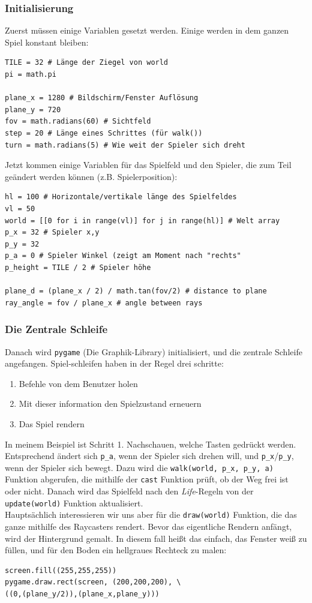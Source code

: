 \documentclass[a4paper,12pt]{report}
\begin{document}
\subsubsection{Initialisierung}

Zuerst müssen einige Variablen gesetzt werden. Einige werden in dem ganzen Spiel konstant bleiben:
\begin{Verbatim}[baselinestretch=1.0, xleftmargin=1cm]
TILE = 32 # Länge der Ziegel von world
pi = math.pi

plane_x = 1280 # Bildschirm/Fenster Auflösung
plane_y = 720
fov = math.radians(60) # Sichtfeld
step = 20 # Länge eines Schrittes (für walk())
turn = math.radians(5) # Wie weit der Spieler sich dreht
\end{Verbatim}

Jetzt kommen einige Variablen für das Spielfeld und den Spieler, die zum Teil geändert werden können (z.B. Spielerposition):
\begin{Verbatim}[baselinestretch=1.0, xleftmargin=1cm]
hl = 100 # Horizontale/vertikale länge des Spielfeldes
vl = 50
world = [[0 for i in range(vl)] for j in range(hl)] # Welt array
p_x = 32 # Spieler x,y
p_y = 32
p_a = 0 # Spieler Winkel (zeigt am Moment nach "rechts"
p_height = TILE / 2 # Spieler höhe

plane_d = (plane_x / 2) / math.tan(fov/2) # distance to plane
ray_angle = fov / plane_x # angle between rays
\end{Verbatim}

\subsubsection{Die Zentrale Schleife}
Danach wird \texttt{pygame} (Die Graphik-Library) initialisiert, und die zentrale Schleife angefangen. Spiel-schleifen haben in der Regel drei schritte:
\begin{enumerate}
	\item Befehle von dem Benutzer holen
	\item Mit dieser information den Spielzustand erneuern
	\item Das Spiel rendern
\end{enumerate}
In meinem Beispiel ist Schritt 1. Nachschauen, welche Tasten gedr\"uckt werden. Entsprechend ändert sich \texttt{p\_a}, wenn der Spieler sich drehen will, und \texttt{p\_x}/\texttt{p\_y}, wenn der Spieler sich bewegt. Dazu wird die \texttt{walk(world, p\_x, p\_y, a)} Funktion abgerufen, die mithilfe der \texttt{cast} Funktion prüft, ob der Weg frei ist oder nicht. Danach wird das Spielfeld nach den \textit{Life}-Regeln von der \texttt{update(world)} Funktion aktualisiert. \\
Hauptsächlich interessieren wir uns aber für die \texttt{draw(world)} Funktion, die das ganze mithilfe des Raycasters rendert. Bevor das eigentliche Rendern anfängt, wird der Hintergrund gemalt. In diesem fall heißt das einfach, das Fenster weiß zu füllen, und für den Boden ein hellgraues Rechteck zu malen:
\begin{Verbatim}[baselinestretch=1.0, xleftmargin=1cm]
screen.fill((255,255,255))
pygame.draw.rect(screen, (200,200,200), \
((0,(plane_y/2)),(plane_x,plane_y)))
\end{Verbatim}
\end{document}
